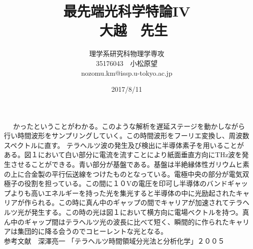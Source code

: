 \documentclass{jsarticle}
\title{最先端光科学特論IV\\　大越　先生}
\author{理学系研究科物理学専攻\\35176043　小松原望\\nozomu.km@issp.u-tokyo.ac.jp}
\date{2017/8/11}
\begin{document}
\maketitle　%
かったということがわかる。このような解析を遅延ステージを動かしながら行い時間波形をサンプリングしていく。この時間波形をフーリエ変換し、周波数スペクトルに直す。
\quad テラヘルツ波の発生及び検出に半導体素子を用いることがある。図１において白い部分に電流を流すことにより紙面垂直方向にTHz波を発生させることができる。青い部分が基盤である。基盤は半絶縁体性ガリウムヒ素の上に合金製の平行伝送線をつけたものとなっている。電極中央の部分が電気双極子の役割を担っている。この間に１０Vの電圧を印可し半導体のバンドギャップよりも高いエネルギーを持った光を集光すると半導体の中に光励起されたキャリアが作られる。この時に真ん中のギャップの間でキャリアが加速されてテラヘルツ光が発生する。この時の光は図１において横方向に電場ベクトルを持つ。真ん中のギャップ間はテラヘルツ光の波長に比べて短く、瞬間的に作られたキャリアは集団的に降る会うのでコヒーレントな光となる。\\
参考文献　深澤亮一 「テラヘルツ時間領域分光法と分析化学」２００５
\end{document}
